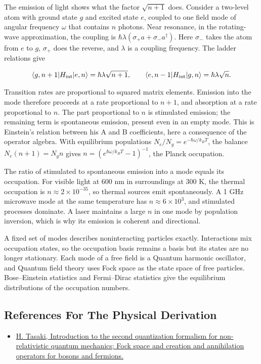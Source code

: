 \documentclass[11pt,oneside]{book}
\newenvironment{centeredalign}{\[\begin{gathered}[c]}{\end{gathered}\]}
\begin{document}
The emission of light shows what the factor \(\sqrt{n+1}\) does. Consider a two-level atom with ground state \(g\) and excited state \(e\), coupled to one field mode of angular frequency \(\omega\) that contains \(n\) photons. Near resonance, in the rotating-wave approximation, the coupling is \(\hbar\lambda(\sigma_+a+\sigma_-a^\dagger)\). Here \(\sigma_-\) takes the atom from \(e\) to \(g\), \(\sigma_+\) does the reverse, and \(\lambda\) is a coupling frequency. The ladder relations give

\begin{centeredalign}
\langle g,n+1|H_{\rm int}|e,n\rangle=\hbar\lambda\sqrt{n+1},\qquad
\langle e,n-1|H_{\rm int}|g,n\rangle=\hbar\lambda\sqrt{n}.
\end{centeredalign}

Transition rates are proportional to squared matrix elements. Emission into the mode therefore proceeds at a rate proportional to \(n+1\), and absorption at a rate proportional to \(n\). The part proportional to \(n\) is stimulated emission; the remaining term is spontaneous emission, present even in an empty mode. This is Einstein's relation between his A and B coefficients, here a consequence of the operator algebra. With equilibrium populations \(N_e/N_g=e^{-\hbar\omega/k_BT}\), the balance \(N_e(n+1)=N_gn\) gives \(n=(e^{\hbar\omega/k_BT}-1)^{-1}\), the Planck occupation.

The ratio of stimulated to spontaneous emission into a mode equals its occupation. For visible light at 600 nm in surroundings at 300 K, the thermal occupation is \(n\approx2\times10^{-35}\), so thermal sources emit spontaneously. A 1 GHz microwave mode at the same temperature has \(n\approx6\times10^3\), and stimulated processes dominate. A laser maintains a large \(n\) in one mode by population inversion, which is why its emission is coherent and directional.

A fixed set of modes describes noninteracting particles exactly. Interactions mix occupation states, so the occupation basis remains a basis but its states are no longer stationary. Each mode of a free field is a Quantum harmonic oscillator, and Quantum field theory uses Fock space as the state space of free particles. Bose--Einstein statistics and Fermi--Dirac statistics give the equilibrium distributions of the occupation numbers.

\subsection*{References For The Physical Derivation}
\begin{itemize}
\item \href{https://arxiv.org/abs/1812.10732}{H. Tasaki, Introduction to the second quantization formalism for non-relativistic quantum mechanics; Fock space and creation and annihilation operators for bosons and fermions.}
\end{itemize}
\end{document}
